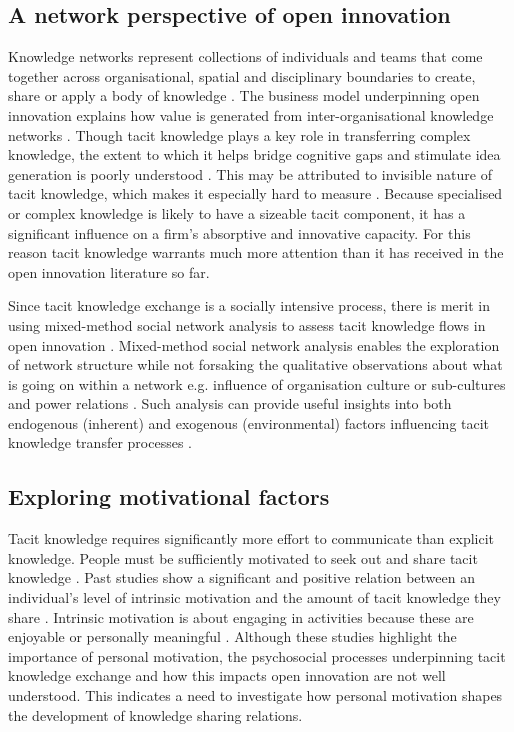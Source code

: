 \subsection{A network perspective of open innovation}

Knowledge networks represent collections of individuals and teams that come together across organisational, spatial and disciplinary boundaries to create, share or apply a body of knowledge \citep{pugh2013designing}. The business model underpinning open innovation explains how value is generated from inter\hyp{}organisational knowledge networks \citep{chiaroni2010unravelling}. Though tacit knowledge plays a key role in transferring complex knowledge, the extent to which it helps bridge cognitive gaps and stimulate idea generation is poorly understood \citep{seidler2008use}. This may be attributed to invisible nature of tacit knowledge, which makes it especially hard to measure \citep{leonard1998role,haldin2000difficulties}. Because specialised or complex knowledge is likely to have a sizeable tacit component, it has a significant influence on a firm's absorptive and innovative capacity. For this reason tacit knowledge warrants much more attention than it has received in the open innovation literature so far. \medskip

Since tacit knowledge exchange is a socially intensive process, there is merit in using mixed\hyp{}method social network analysis to assess tacit knowledge flows in open innovation \citep{leonard1998role,busch2000graphically,zhu2007social}. Mixed\hyp{}method social network analysis enables the exploration of network structure while not forsaking the qualitative observations about what is going on within a network e.g. influence of organisation culture or sub-cultures and power relations \citep{crossley2010social}. Such analysis can provide useful insights into both endogenous (inherent) and exogenous (environmental) factors influencing tacit knowledge transfer processes \citep{kolleck2013social,tortoriello2015social}. \medskip

\subsection{Exploring motivational factors}

Tacit knowledge requires significantly more effort to communicate than explicit knowledge. People must be sufficiently motivated to seek out and share tacit knowledge \citep{leonard1998role}. Past studies show a significant and positive relation between an individual's level of intrinsic motivation and the amount of tacit knowledge they share \citep[e.g.][]{osterloh2000motivation,kaser2001knowledge,smith2001role}. Intrinsic motivation is about engaging in activities because these are enjoyable or personally meaningful \citep{ryan2000intrinsic}. Although these studies highlight the importance of personal motivation, the psychosocial processes underpinning tacit knowledge exchange and how this impacts open innovation are not well understood. This indicates a need to investigate how personal motivation shapes the development of knowledge sharing relations. \medskip

